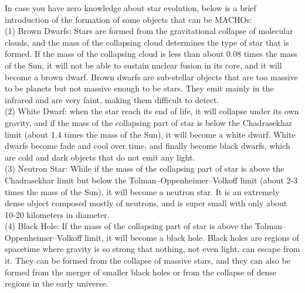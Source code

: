\begin{extra}
    In case you have zero knowledge about star evolution, below is a brief introduction of the formation of some objects that can be MACHOs: \\

    (1) Brown Dwarfs: Stars are formed from the gravitational collapse of molecular clouds, and the mass of the collapsing cloud determines the type of star that is formed. If the mass of the collapsing cloud is less than about 0.08 times the mass of the Sun, it will not be able to sustain nuclear fusion in its core, and it will become a brown dwarf. Brown dwarfs are sub-stellar objects that are too massive to be planets but not massive enough to be stars. They emit mainly in the infrared and are very faint, making them difficult to detect. \\

    (2) White Dwarf: when the star reach its end of life, it will collapse under its own gravity, and if the mass of the collapsing part of star is below the Chadrasekhar limit (about 1.4 times the mass of the Sun), it will become a white dwarf. White dwarfs become fade and cool over time, and finally become black dwarfs, which are cold and dark objects that do not emit any light. \\

    (3) Neutron Star: While if the mass of the collapsing part of star is above the Chadrasekhar limit but below the Tolman–Oppenheimer–Volkoff limit (about 2-3 times the mass of the Sun), it will become a neutron star. It is an extremely dense object composed mostly of neutrons, and is super small with only about 10-20 kilometers in diameter. \\

    (4) Black Hole: If the mass of the collapsing part of star is above the Tolman–Oppenheimer–Volkoff limit, it will become a black hole. Black holes are regions of spacetime where gravity is so strong that nothing, not even light, can escape from it. They can be formed from the collapse of massive stars, and they can also be formed from the merger of smaller black holes or from the collapse of dense regions in the early universe.
\end{extra}

\bigskip \noindent \bigskip \noindent \bigskip \noindent
